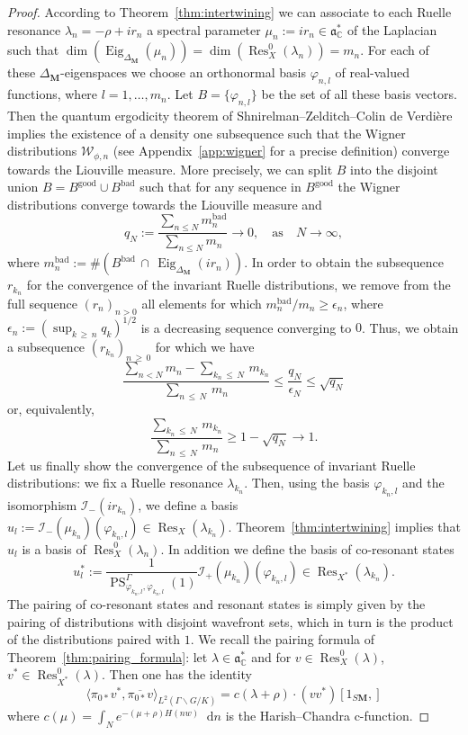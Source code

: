 \documentclass[10pt]{amsart}
\theoremstyle{definition}
\DeclareMathOperator{\Res}{Res}
\DeclareMathOperator{\Eig}{Eig}
\DeclareMathOperator{\good}{good}
\DeclareMathOperator{\bad}{bad}
\newcommand{\cc}{\mathbb{C}}
\newcommand{\bfm}{\mathbf{M}}
\newcommand{\la}{\lambda}
\newcommand{\eps}{\epsilon}
\newcommand{\intd}{\mathop{}\!\mathrm{d}}
\renewcommand{\a}{\mathfrak a}
\begin{document}
\begin{proof}
According to Theorem~\ref{thm:intertwining} we can associate to each Ruelle resonance $\la_n=-\rho+ir_n$ a spectral parameter $\mu_n:=ir_n \in \a^*_\cc$ of the Laplacian such that $\dim(\Eig_{\Delta_{\bfm}}(\mu_n))=\dim(\Res^{0}_{X}(\la_n)) = m_n$. For each of these $\Delta_{\bfm}$-eigenspaces we choose an orthonormal basis $\varphi_{n,l}$ of real-valued functions, where $l=1,\ldots,m_n$. Let $B= \{\varphi_{n,l}\}$ be the set of all these basis vectors. Then the quantum ergodicity theorem of Shnirelman--Zelditch--Colin de Verdière~\cite{Shn74, CdV85, Zel87} implies the existence of a density one subsequence such that the Wigner distributions $\mathcal W_{\phi, n}$ (see Appendix~\ref{app:wigner} for a precise definition) converge towards the Liouville measure. More precisely, we can split $B$ into the disjoint union $B=B^{\good}\cup B^{\bad}$ such that for any sequence in $B^{\good}$ the Wigner distributions converge towards the Liouville measure and
\[
q_N:= \frac{\sum_{n\leq N} m_n^{\bad} }{\sum_{n\leq N} m_n}\to 0,\quad\text{as}\quad N\to\infty,
\]
where $m_n^{\bad}:=\# (B^{\bad}\,\cap\,\Eig_{\Delta_{\bfm}}(ir_n))$. In order to obtain the subsequence $r_{k_n}$ for the convergence of the invariant Ruelle distributions, we remove from the full sequence $(r_n)_{n>0}$ all elements for which $m_n^{\bad}/m_n \geq \eps_n$, where $\eps_n:=(\sup_{k\,\geq\,n}q_k)^{1/2}$ is a decreasing sequence converging to $0$. Thus, we obtain a subsequence $(r_{k_n})_{n\,\geq\,0}$ for which we have
\[
\frac{\sum_{n< N} m_{n}-\sum_{k_n\,\leq\,N}\,m_{k_n}}{\sum_{n\,\leq\,N}\,m_n}
\leq \frac{q_N}{\eps_N}\leq \sqrt{q_N}
\]
or, equivalently,
\[
\frac{\sum_{k_n\,\leq\,N}\,m_{k_n}}{\sum_{n\,\leq\,N}\,m_n}\geq 1-\sqrt{q_N}\to 1.
\]
Let us finally show the convergence of the subsequence of invariant Ruelle distributions: we fix a Ruelle resonance $\la_{k_n}$. Then, using the basis $\varphi_{k_n,l}$ and the isomorphism $\mathcal I_-(ir_{k_n})$, we define a basis $u_l:= \mathcal I_-(\mu_{k_n})(\varphi_{k_n, l}) \in \Res_{X}(\la_{k_n})$. Theorem~\ref{thm:intertwining} implies that $u_l$ is a basis of $\Res^0_{X}(\la_n)$. In addition we define the basis of co-resonant states
\[
u_l^*:= \frac{1}{\operatorname{PS}^\Gamma_ {\varphi_{k_n,l},\varphi_{k_n,l}}(1)}\mathcal I_+(\mu_{k_n})(\varphi_{k_n,l})\in
\Res_{X^*}(\la_{k_n}).
\]
The pairing of co-resonant states and resonant states is simply given by the pairing of distributions with disjoint wavefront sets, which in turn is the product of the distributions paired with $1$. We recall the pairing formula of Theorem~\ref{thm:pairing_formula}: let $\lambda \in \a_\cc^*$ and for $v\in \Res_{X}^0(\lambda)$, $v^*\in \Res_{X^*}^0(\lambda)$. Then one has the identity
\begin{equation}\label{eq:pairing}
\langle\pi_{0*} v^*, \overline{\pi_{0*}v} \rangle_{L^2(\Gamma\backslash G/K)} = c(\lambda + \rho)\cdot (v v^*)[1_{S\mathbf M},]
\end{equation}
where $c(\mu) = \int_N e^{-(\mu + \rho)H(nw)}\intd n$ is the Harish--Chandra c-function.


\end{proof}
\end{document}
